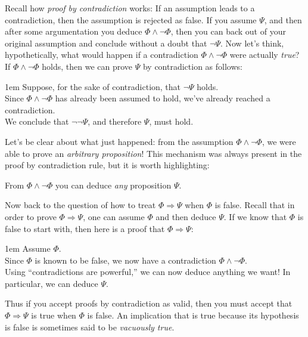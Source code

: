 \documentclass[12pt]{article}
\newcommand{\AND}{\wedge}
\newcommand{\ARR}{\Rightarrow}
\newcounter{rule}
\def\putRuleNumber{\refstepcounter{rule}\therule}
\newcommand{\indented}[1]{\begin{adjustwidth}{1em}{}#1\end{adjustwidth}}
\newcommand{\DRULE}[2]{\begin{tcolorbox}[title=Derived Rule \putRuleNumber: #1,colbacktitle=white,coltitle=black,colback=white]#2\end{tcolorbox}} %
\def\pA{\Phi}
\def\pB{\Psi}
\begin{document}
\def\vsp{\\[0.5em]}

Recall how \emph{proof by contradiction} works:
If an assumption leads to a contradiction, then the assumption is rejected as false.
If you assume $\pB$, and then after some argumentation you deduce $\pA\AND\neg\pA$, then
you can back out of your original assumption and conclude without a doubt that $\neg\pB$.
Now let's think, hypothetically, what would happen if a contradiction $\pA\AND\neg\pA$ were actually \emph{true}?
If $\pA\AND\neg\pA$ holds, then we can prove $\pB$ by contradiction as follows:
\indented{
Suppose, for the sake of contradiction, that $\neg\pB$ holds.\vsp
Since $\pA\AND\neg\pA$ has already been assumed to hold, we've already reached a contradiction.\vsp
We conclude that $\neg\neg\pB$, and therefore $\pB$, must hold.
}
Let's be clear about what just happened: from the assumption $\pA\AND\neg\pA$, we were able to prove an \emph{arbitrary proposition}!
This mechanism was always present in the proof by contradiction rule, but it is worth highlighting:

\DRULE{\label{rule:contradictions}Contradictions are powerful!}{
From $\pA\AND\neg\pA$ you can deduce \emph{any} proposition $\pB$.
}

Now back to the question of how to treat $\pA\ARR\pB$ when $\pA$ is false.
Recall that in order to prove $\pA\ARR\pB$, one can assume $\pA$ and then deduce $\pB$.
If we know that $\pA$ is false to start with, then here is a proof that $\pA\ARR\pB$:
\indented{
Assume $\pA$.\vsp
Since $\pA$ is known to be false, we now have a contradiction $\pA\AND\neg\pA$.\vsp
Using ``contradictions are powerful,'' we can now deduce anything we want! In particular, we can deduce $\pB$.
}
Thus if you accept proofs by contradiction as valid, then you must accept that $\pA\ARR\pB$ is true when $\pA$ is false.
An implication that is true because its hypothesis is false is sometimes said to be \emph{vacuously true}.
\end{document}
